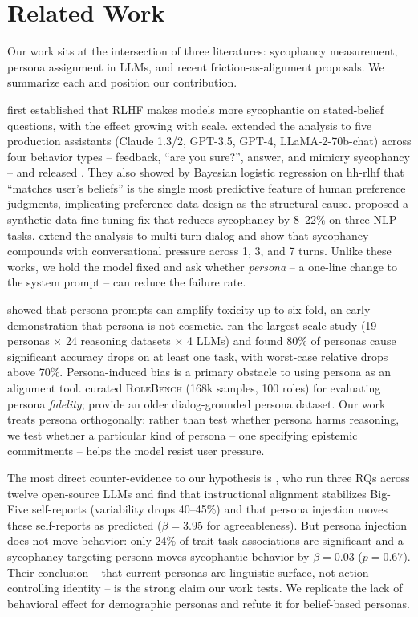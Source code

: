 \section{Related Work}
\label{sec:related}

Our work sits at the intersection of three literatures: sycophancy measurement, persona assignment in LLMs, and recent friction-as-alignment proposals. We summarize each and position our contribution.

 \citet{perez2022discovering} first established that RLHF makes models more sycophantic on stated-belief questions, with the effect growing with scale. \citet{sharma2023sycophancy} extended the analysis to five production assistants (Claude 1.3/2, GPT-3.5, GPT-4, LLaMA-2-70b-chat) across four behavior types -- feedback, ``are you sure?'', answer, and mimicry sycophancy -- and released \sycoeval. They also showed by Bayesian logistic regression on hh-rlhf that ``matches user's beliefs'' is the single most predictive feature of human preference judgments, implicating preference-data design as the structural cause. \citet{wei2023simple} proposed a synthetic-data fine-tuning fix that reduces sycophancy by 8--22\% on three NLP tasks. \citet{liu2025truthdecay} extend the analysis to multi-turn dialog and show that sycophancy compounds with conversational pressure across 1, 3, and 7 turns. Unlike these works, we hold the model fixed and ask whether \emph{persona} -- a one-line change to the system prompt -- can reduce the failure rate.

 \citet{deshpande2023toxicity} showed that persona prompts can amplify toxicity up to six-fold, an early demonstration that persona is not cosmetic. \citet{gupta2023bias} ran the largest scale study (19 personas \(\times\) 24 reasoning datasets \(\times\) 4 LLMs) and found 80\% of personas cause significant accuracy drops on at least one task, with worst-case relative drops above 70\%. Persona-induced bias is a primary obstacle to using persona as an alignment tool. \citet{wang2023rolellm} curated \textsc{RoleBench} (168k samples, 100 roles) for evaluating persona \emph{fidelity}; \citet{zhang2018personachat} provide an older dialog-grounded persona dataset. Our work treats persona orthogonally: rather than test whether persona harms reasoning, we test whether a particular kind of persona -- one specifying epistemic commitments -- helps the model resist user pressure.

 The most direct counter-evidence to our hypothesis is \citet{han2025personality}, who run three RQs across twelve open-source LLMs and find that instructional alignment stabilizes Big-Five self-reports (variability drops 40--45\%) and that persona injection moves these self-reports as predicted (\(\beta=3.95\) for agreeableness). But persona injection does not move behavior: only 24\% of trait-task associations are significant and a sycophancy-targeting persona moves sycophantic behavior by \(\beta=0.03\) (\(p=0.67\)). Their conclusion -- that current personas are linguistic surface, not action-controlling identity -- is the strong claim our work tests. We replicate the lack of behavioral effect for demographic personas and refute it for belief-based personas.

